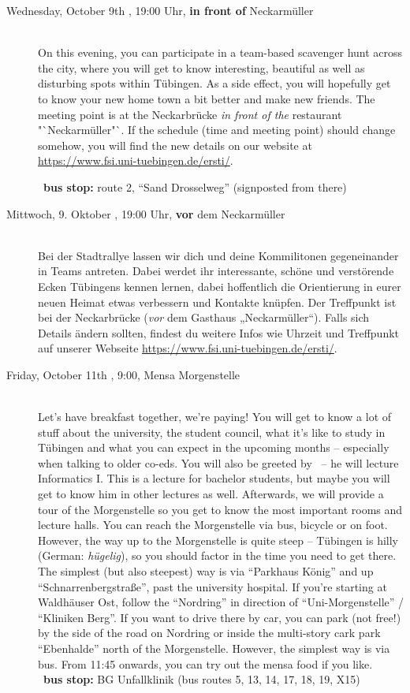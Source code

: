 \begin{description}
\ifml
	\item[Wednesday, October 9th \YEAR, 19:00 Uhr, \textbf{in front of} Neckarmüller ]\ \\
	On this evening, you can participate in a team-based scavenger hunt across the city, where you will get to know interesting, beautiful as well as disturbing spots within Tübingen. As a side effect, you will hopefully get to know your new home town a bit better and make new friends. The meeting point is at the Neckarbrücke \emph{in front of the} restaurant "`Neckarmüller"`.
	If the schedule (time and meeting point) should change somehow, you will find the new details on our website at \url{https://www.fsi.uni-tuebingen.de/ersti/}.

	~\textbf{bus stop:} route 2, "`Sand Drosselweg"' (signposted from there)
\else
	 \item[Mittwoch, 9. Oktober \YEAR, 19:00 Uhr, \textbf{vor} dem Neckarmüller ]\ \\
	 Bei der Stadtrallye lassen wir dich und deine Kommilitonen gegeneinander in Teams antreten. Dabei werdet ihr interessante, schöne und verstörende Ecken Tübingens kennen lernen, dabei hoffentlich die Orientierung in eurer neuen Heimat etwas verbessern und Kontakte knüpfen. Der Treffpunkt ist bei der Neckarbrücke (\emph{vor} dem Gasthaus „Neckarmüller“).
	 Falls sich Details ändern sollten, findest du weitere Infos wie Uhrzeit und Treffpunkt auf unserer Webseite \url{https://www.fsi.uni-tuebingen.de/ersti/}.
\fi

\ifml
    \item[Friday, October 11th \YEAR, 9:00, Mensa Morgenstelle]\ \\
        Let's have breakfast together, we're paying! You will get to know a lot of stuff about the university, the student council, what it's like to study in Tübingen and what you can expect in the upcoming months -- especially when talking to older co-eds.
    \ifwintersemester You will also be greeted by \Infoprof~-- he will lecture Informatics I. This is a lecture for bachelor students, but maybe you will get to know him in other lectures as well. \fi
    Afterwards, we will provide a tour of the Morgenstelle so you get to know the most important rooms and lecture halls.
    You can reach the Morgenstelle via bus, bicycle or on foot. However, the way up to the Morgenstelle is quite steep -- Tübingen is hilly (German: \emph{hügelig}), so you should factor in the time you need to get there.
    The simplest (but also steepest) way is via "`Parkhaus König"' and up "`Schnarrenbergstraße"', past the university hospital. If you're starting at Waldhäuser Ost, follow the "`Nordring"' in direction of "`Uni-Morgenstelle"' / "`Kliniken Berg"'.
    If you want to drive there by car, you can park (not free!) by the side of the road on Nordring or inside the multi-story cark park "`Ebenhalde"' north of the Morgenstelle. However, the simplest way is via bus.
    From 11:45 onwards, you can try out the mensa food if you like.\\
    ~\textbf{bus stop:} BG Unfallklinik (bus routes 5, 13, 14, 17, 18, 19, X15)


\end{description}
